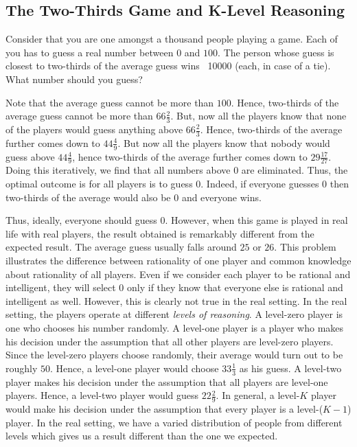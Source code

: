 \documentclass{article}
\theoremstyle{definition}
\begin{document}
\subsection{The Two-Thirds Game and K-Level Reasoning}

Consider that you are one amongst a thousand people playing a game. Each of you has to guess a real number between $0$ and $100$. The person whose guess is closest to two-thirds of the average guess wins \rupee~10000 (each, in case of a tie). What number should you guess? \medskip

Note that the average guess cannot be more than $100$. Hence, two-thirds of the average guess cannot be more than $66 \frac{2}{3}$. But, now all the players know that none of the players would guess anything above $66 \frac{2}{3}$. Hence, two-thirds of the average further comes down to $44 \frac{4}{9}$. But now all the players know that nobody would guess above $44 \frac{4}{9}$, hence two-thirds of the average further comes down to $29 \frac{17}{27}$. Doing this iteratively, we find that all numbers above $0$ are eliminated. Thus, the optimal outcome is for all players is to guess $0$. Indeed, if everyone guesses $0$ then two-thirds of the average would also be $0$ and everyone wins. \medskip

Thus, ideally, everyone should guess 0. However, when this game is played in real life with real players, the result obtained is remarkably different from the expected result. The average guess usually falls around $25$ or $26$. This problem illustrates the difference between rationality of one player and common knowledge about rationality of all players. Even if we consider each player to be rational and intelligent, they will select $0$ only if they know that everyone else is rational and intelligent as well. However, this is clearly not true in the real setting. In the real setting, the players operate at different \textit{levels of reasoning}. A level-zero player is one who chooses his number randomly. A level-one player is a player who makes his decision under the assumption that all other players are level-zero players. Since the level-zero players choose randomly, their average would turn out to be roughly $50$. Hence, a level-one player would choose $33 \frac{1}{3}$ as his guess. A level-two player makes his decision under the assumption that all players are level-one players. Hence, a level-two player would guess $22 \frac{2}{9}$. In general, a level-$K$ player would make his decision under the assumption that every player is a level-($K-1$) player. In the real setting, we have a varied distribution of people from different levels which gives us a result different than the one we expected. 
\end{document}
